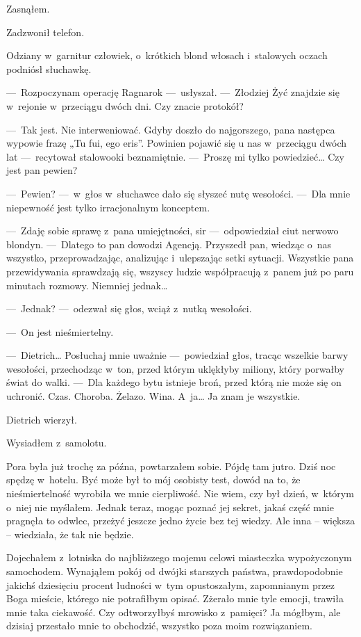 Zasnąłem.

\paraSep

Zadzwonił telefon.

Odziany w~garnitur człowiek, o~krótkich blond włosach i~stalowych oczach podniósł słuchawkę.

---~Rozpoczynam operację Ragnarok ---~usłyszał. ---~Złodziej Żyć znajdzie się w~rejonie w~przeciągu dwóch dni. Czy znacie protokół?

---~Tak jest. Nie interweniować. Gdyby doszło do najgorszego, pana następca wypowie frazę „Tu fui, ego eris”. Powinien pojawić się u nas w~przeciągu dwóch lat ---~recytował stalowooki beznamiętnie. ---~Proszę mi tylko powiedzieć… Czy jest pan pewien?

---~Pewien? ---~w~głos w~słuchawce dało się słyszeć nutę wesołości. ---~Dla mnie niepewność jest tylko irracjonalnym konceptem.

---~Zdaję sobie sprawę z~pana umiejętności, sir ---~odpowiedział ciut nerwowo blondyn. ---~Dlatego to pan dowodzi Agencją. Przyszedł pan, wiedząc o~nas wszystko, przeprowadzając, analizując i~ulepszając setki sytuacji. Wszystkie pana przewidywania sprawdzają się, wszyscy ludzie współpracują z~panem już po paru minutach rozmowy. Niemniej jednak…

---~Jednak? ---~odezwał się głos, wciąż z~nutką wesołości.

---~On jest nieśmiertelny.

---~Dietrich… Posłuchaj mnie uważnie ---~powiedział głos, tracąc wszelkie barwy wesołości, przechodząc w~ton, przed którym uklękłyby miliony, który porwałby świat do walki. ---~Dla każdego bytu istnieje broń, przed którą nie może się on uchronić. Czas. Choroba. Żelazo. Wina. A~ja… Ja znam je wszystkie.

Dietrich wierzył.

\paraSep

Wysiadłem z~samolotu.

Pora była już trochę za późna, powtarzałem sobie. Pójdę tam jutro. Dziś noc spędzę w~hotelu. Być może był to mój osobisty test, dowód na to, że nieśmiertelność wyrobiła we mnie cierpliwość. Nie wiem, czy był dzień, w~którym o~niej nie myślałem. Jednak teraz, mogąc poznać jej sekret, jakaś część mnie pragnęła to odwlec, przeżyć jeszcze jedno życie bez tej wiedzy. Ale inna -- większa -- wiedziała, że tak nie będzie.

Dojechałem z~lotniska do najbliższego mojemu celowi miasteczka wypożyczonym samochodem. Wynająłem pokój od dwójki starszych państwa, prawdopodobnie jakichś dziesięciu procent ludności w~tym opustoszałym, zapomnianym przez Boga mieście, którego nie potrafiłbym opisać. Zżerało mnie tyle emocji, trawiła mnie taka ciekawość. Czy odtworzyłbyś mrowisko z~pamięci? Ja mógłbym, ale dzisiaj przestało mnie to obchodzić, wszystko poza moim rozwiązaniem.

